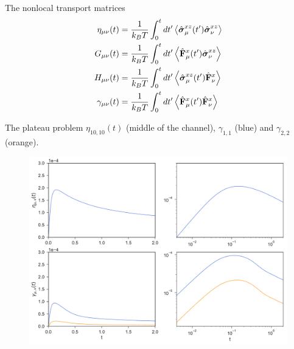 \documentclass{beamer}
\begin{document}
\begin{frame}{The nonlocal transport matrices} 
\begin{align}
\eta_{\mu\nu}(t)
&=\frac{1}{k_BT}\int_0^t dt'
\left\langle \hat{\boldsymbol{\sigma}}^{xz}_{\mu}(t')\hat{\boldsymbol{\sigma}}^{xz}_{\nu}
\right\rangle
\nonumber\\
  G_{\mu\nu}(t)&=\frac{1}{k_BT}\int_0^t dt'
\left\langle\hat{\bf F}^x_\mu(t')
\hat{\boldsymbol{\sigma}}^{xz}_\nu
\right\rangle
\nonumber\\
H_{\mu\nu}(t)&=
\frac{1}{k_BT}\int_0^t dt'
\left\langle\hat{\boldsymbol{\sigma}}^{xz}_\mu(t')\hat{\bf F}^{x}_\nu\right\rangle
\nonumber\\
  \gamma_{\mu\nu}(t)
&=\frac{1}{k_BT}\int_0^t dt'
\left\langle 
\hat{\bf F}^{x}_\mu(t')
\hat{\bf F}^{x}_\nu\right\rangle
\nonumber
\end{align}
\end{frame}
\begin{frame}{The plateau problem}
$\eta_{10,10}(t)$ (middle of the channel), $\gamma_{1,1}$ (blue) and $\gamma_{2,2}$ (orange). 
\begin{figure}[]
  \includegraphics[scale=0.33]{NoPlateau-WALLS-17nodes}
\end{figure}
\end{frame}
\end{document}
